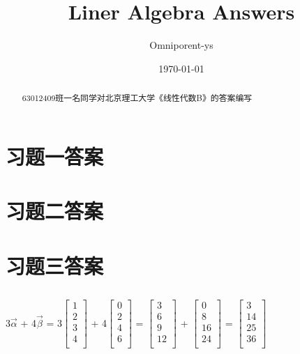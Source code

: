 \documentclass{ctexart}
\title{Liner Algebra Answers}
\author{Omniporent-ys}
\date{\today}
\begin{document}
    \maketitle

    \begin{abstract}
        63012409班一名同学对北京理工大学《线性代数B》的答案编写
    \end{abstract}
    \section{习题一答案}
    \section{习题二答案}
    \section{习题三答案}
        \subsection{}
            \begin{mdframed}
            3$\vec{\alpha}$ + 4$\vec{\beta}$
            = 3$\begin{bmatrix}
                1 \\
                2 \\
                3 \\
                4\\           
               \end{bmatrix}$
               + 4$\begin{bmatrix}
                0 \\
                2 \\
                4 \\
                6 \\           
               \end{bmatrix}$
             = $\begin{bmatrix}
                3 \\
                6 \\
                9 \\
                12 \\           
               \end{bmatrix}$
               +
               $\begin{bmatrix}
                0 \\
                8 \\
                16 \\
                24 \\           
               \end{bmatrix}$
                = 
                $\begin{bmatrix}
                3 \\
                14 \\
                25 \\
                36 \\           
               \end{bmatrix}$
            \end{mdframed}
        
\end{document}
